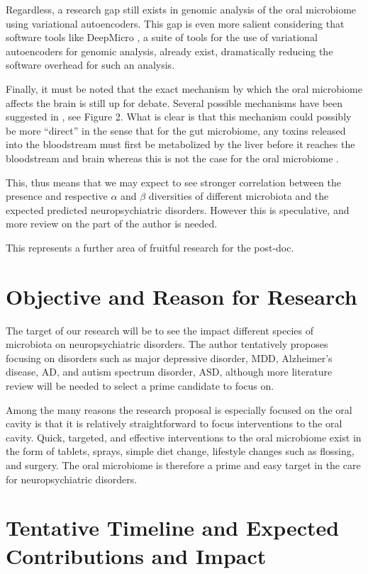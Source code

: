 \documentclass{article}
\begin{document}
\begin{multicols}{2}
 Regardless, a research gap still exists in genomic analysis of the oral microbiome using variational autoencoders. This gap is even more salient considering that software tools like DeepMicro \cite{oh_deepmicro_2020}, a suite of tools for the use of variational autoencoders for genomic analysis, already exist, dramatically reducing the software overhead for such an analysis.
 
 Finally, it must be noted that the exact mechanism by which the oral microbiome affects the brain is still up for debate. Several possible mechanisms have been suggested in \cite{tao_relationship_2024}, see Figure 2. What is clear is that this mechanism could possibly be more ``direct'' in the sense that for the gut microbiome, any toxins released into the bloodstream must first be metabolized by the liver before it reaches the bloodstream and brain \cite{REFISCH2023109568} whereas this is not the case for the oral microbiome \cite{tao_relationship_2024}. 
 
 This, thus means that we may expect to see stronger correlation between the presence and respective $\alpha$ and $\beta$ diversities of different microbiota and the expected predicted neuropsychiatric disorders. However this is speculative, and more review on the part of the author is needed.
 
 This represents a further area of fruitful research for the post-doc.
\section{Objective and Reason for Research}
The target of our research will be to see the impact different species of microbiota on neuropsychiatric disorders. The author tentatively proposes focusing on disorders such as major depressive disorder, MDD, Alzheimer's disease, AD, and autism spectrum disorder, ASD, although more literature review will be needed to select a prime candidate to focus on.

Among the many reasons the research proposal is especially focused on the oral cavity is that it is relatively straightforward to focus interventions to the oral cavity. Quick, targeted, and effective interventions to the oral microbiome exist in the form of tablets, sprays, simple diet change, lifestyle changes such as flossing, and surgery. The oral microbiome is therefore a prime and easy target in the care for neuropsychiatric disorders. 
\section{Tentative Timeline and Expected Contributions and Impact}



\end{multicols}
\end{document}
